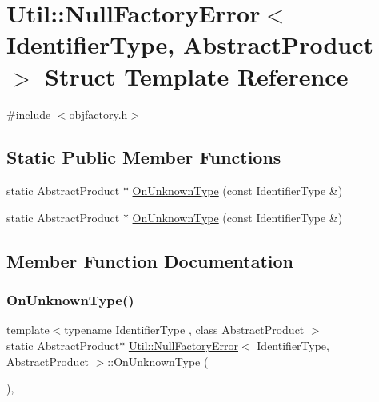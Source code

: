 \hypertarget{structUtil_1_1NullFactoryError}{}\section{Util\+:\+:Null\+Factory\+Error$<$ Identifier\+Type, Abstract\+Product $>$ Struct Template Reference}
\label{structUtil_1_1NullFactoryError}


{\ttfamily \#include $<$objfactory.\+h$>$}

\subsection*{Static Public Member Functions}
\begin{DoxyCompactItemize}
\item 
static Abstract\+Product $\ast$ \mbox{\hyperlink{structUtil_1_1NullFactoryError_a237b7bcb3c07a5337eec26c8d9f40e1b}{On\+Unknown\+Type}} (const Identifier\+Type \&)
\item 
static Abstract\+Product $\ast$ \mbox{\hyperlink{structUtil_1_1NullFactoryError_a237b7bcb3c07a5337eec26c8d9f40e1b}{On\+Unknown\+Type}} (const Identifier\+Type \&)
\end{DoxyCompactItemize}


\subsection{Member Function Documentation}
\mbox{\label{structUtil_1_1NullFactoryError_a237b7bcb3c07a5337eec26c8d9f40e1b}} 
\subsubsection{\texorpdfstring{OnUnknownType()}{OnUnknownType()}\hspace{0.1cm}{\footnotesize\ttfamily [1/2]}}
{\footnotesize\ttfamily template$<$typename Identifier\+Type , class Abstract\+Product $>$ \\
static Abstract\+Product$\ast$ \mbox{\hyperlink{structUtil_1_1NullFactoryError}{Util\+::\+Null\+Factory\+Error}}$<$ Identifier\+Type, Abstract\+Product $>$\+::On\+Unknown\+Type (\begin{DoxyParamCaption}\item[{const Identifier\+Type \&}]{ }\end{DoxyParamCaption})\hspace{0.3cm}{\ttfamily [inline]}, {\ttfamily [static]}}

